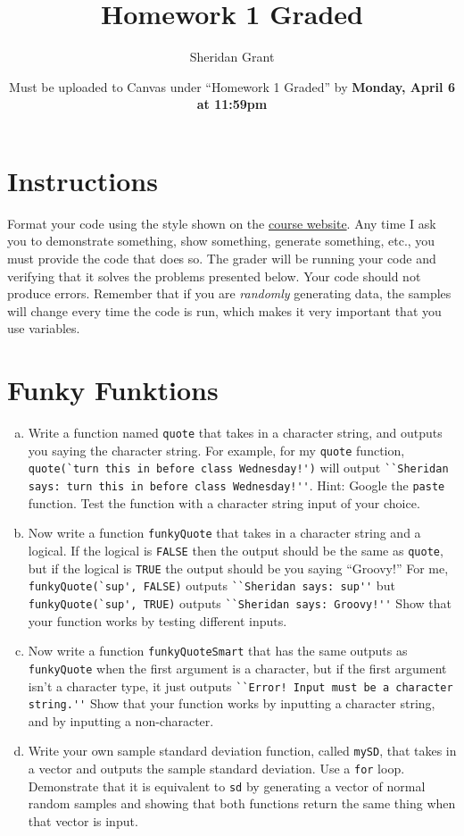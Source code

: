 \documentclass[12pt]{article}
\title{Homework 1 Graded}
\author{Sheridan Grant}
\date{Must be uploaded to Canvas under ``Homework 1 Graded'' by \textbf{Monday, April 6 at 11:59pm}}
\begin{document}
\sloppy

\maketitle

\section*{Instructions}

Format your code using the style shown on the \href{https://sheridanlgrant.github.io/teaching/STAT302_SPR2020}{course website}. Any time I ask you to demonstrate something, show something, generate something, etc., you must provide the code that does so. The grader will be running your code and verifying that it solves the problems presented below. Your code should not produce errors. Remember that if you are \textit{randomly} generating data, the samples will change every time the code is run, which makes it very important that you use variables.

\section{Funky Funktions}

\begin{enumerate}[(a)]
	\item Write a function named \verb|quote| that takes in a character string, and outputs you saying the character string. For example, for my \verb|quote| function, \verb|quote(`turn this in before class Wednesday!')| will output \verb|``Sheridan says: turn this in before class Wednesday!''|. Hint: Google the \verb|paste| function. Test the function with a character string input of your choice.
	\item Now write a function \verb|funkyQuote| that takes in a character string and a logical. If the logical is \verb|FALSE| then the output should be the same as \verb|quote|, but if the logical is \verb|TRUE| the output should be you saying ``Groovy!'' For me, \verb|funkyQuote(`sup', FALSE)| outputs \verb|``Sheridan says: sup''| but \verb|funkyQuote(`sup', TRUE)| outputs \verb|``Sheridan says: Groovy!''| Show that your function works by testing different inputs.
	\item Now write a function \verb|funkyQuoteSmart| that has the same outputs as \verb|funkyQuote| when the first argument is a character, but if the first argument isn't a character type, it just outputs \verb|``Error! Input must be a character string.''| Show that your function works by inputting a character string, and by inputting a non-character.
	\item Write your own sample standard deviation function, called \verb|mySD|, that takes in a vector and outputs the sample standard deviation. Use a \verb|for| loop. Demonstrate that it is equivalent to \verb|sd| by generating a vector of normal random samples and showing that both functions return the same thing when that vector is input.
\end{enumerate}
\end{document}
